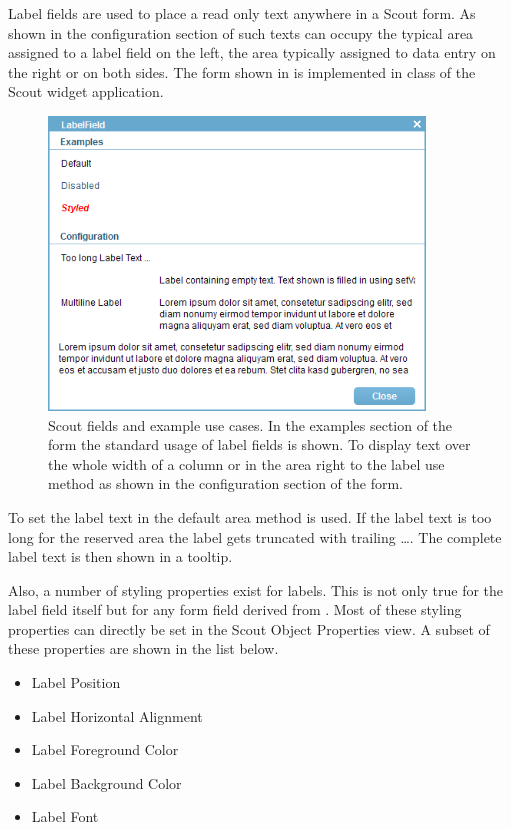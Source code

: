 \documentclass[a4paper,10pt,twoside]{book}
\begin{document}
Label fields are used to place a read only text anywhere in a Scout form. 
As shown in the configuration section of  such texts can occupy the typical area assigned to a label field on the left, the area typically assigned to data entry on the right or on both sides.
The form shown in  is implemented in class  of the Scout widget application.

\begin{figure}
\includegraphics[width=10cm]{labelfield.png}
\caption{Scout fields and example use cases. 
In the examples section of the form the standard usage of label fields is shown.
To display text over the whole width of a column or in the area right to the label use method  as shown in the configuration section of the form.}
\end{figure}

To set the label text in the default area method  is used. 
If the label text is too long for the reserved area the label gets truncated with trailing \dots.
The complete label text is then shown in a tooltip.

Also, a number of  styling properties exist for labels.
This is not only true for the label field itself but for any form field derived from .
Most of these styling properties can directly be set in the Scout Object Properties view.
A subset of these properties are shown in the list below.

\begin{itemize}
  \item Label Position
  \item Label Horizontal Alignment
  \item Label Foreground Color
  \item Label Background Color
  \item Label Font
\end{itemize}
\end{document}
